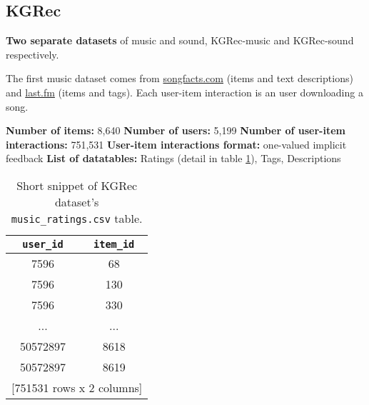 



\subsection{KGRec}
\textbf{Two separate datasets} of music and sound, KGRec-music and KGRec-sound respectively.

The first music dataset comes from \href{https://www.songfacts.com/}{songfacts.com} (items and text descriptions) and \href{https://www.last.fm/}{last.fm} (items and tags). Each user-item interaction is an user downloading a song.

\hfill \break
\noindent
\textbf{Number of items:} 8,640 \newline
\textbf{Number of users:} 5,199 \newline
\textbf{Number of user-item interactions:} 751,531 \newline
\textbf{User-item interactions format:} one-valued implicit feedback \newline
\textbf{List of datatables:} Ratings (detail in table \ref{table:5.1_KGRec_ratings}), Tags, Descriptions

\begin{table}[!ht]
    \centering
    \begin{tabular}{ c c }
        \verb|user_id|   & \verb|item_id| \\
        \hline
        7596     &  68  \\
        7596     & 130  \\
        7596     & 330  \\
        ...      & ...  \\
        50572897 & 8618 \\
        50572897 & 8619 \\ [1mm]
        \multicolumn{2}{l}{{[751531 rows x 2 columns]}}
    \end{tabular}
    \caption{Short snippet of KGRec dataset's \texttt{music\_ratings.csv} table.}
    \label{table:5.1_KGRec_ratings}
\end{table}


